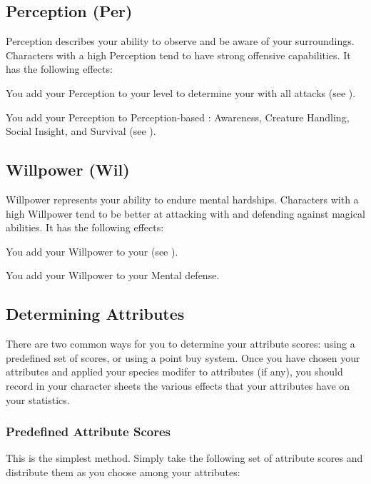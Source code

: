    \subsection{Perception (Per)}\label{Perception}
        {
            Perception describes your ability to observe and be aware of your surroundings.
            Characters with a high Perception tend to have strong offensive capabilities.
            It has the following effects:
            \begin{raggeditemize}
                \item You add your Perception to your level to determine your  with all attacks (see ).
                \item You add your Perception to Perception-based : Awareness, Creature Handling, Social Insight, and Survival (see ).
            \end{raggeditemize}
        }

    \subsection{Willpower (Wil)}\label{Willpower}
        {
            Willpower represents your ability to endure mental hardships.
            Characters with a high Willpower tend to be better at attacking with and defending against magical abilities.
            It has the following effects:
            \begin{raggeditemize}
                \item You add your Willpower to your  (see ).
                \item You add your Willpower to your Mental defense.
            \end{raggeditemize}
        }


    \subsection{Determining Attributes}\label{Determining Attributes}
        There are two common ways for you to determine your attribute scores: using a predefined set of scores, or using a point buy system.
        Once you have chosen your attributes and applied your species modifer to attributes (if any), you should record in your character sheets the various effects that your attributes have on your statistics.

        \subsubsection{Predefined Attribute Scores}
            This is the simplest method.
            Simply take the following set of attribute scores and distribute them as you choose among your attributes:

